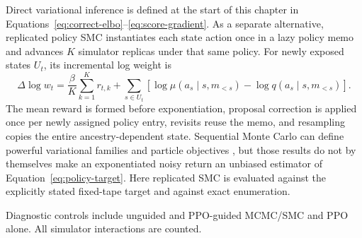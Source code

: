 Direct variational inference is defined at the start of this chapter in
Equations~\eqref{eq:correct-elbo}--\eqref{eq:score-gradient}. As a separate
alternative, replicated policy SMC instantiates each state action once in a lazy
policy memo and advances \(K\) simulator replicas under that same policy.
For newly exposed states \(U_t\), its incremental log weight is
\begin{equation}
  \Delta\log w_t
  = \frac{\beta}{K}\sum_{k=1}^{K}r_{t,k}
    +\sum_{s\in U_t}
      \left[\log\mu(a_s\mid s,m_{<s})
            -\log q(a_s\mid s,m_{<s})\right].
  \label{eq:guided-weight}
\end{equation}
The mean reward is formed before exponentiation, proposal correction is applied
once per newly assigned policy entry, revisits reuse the memo, and resampling
copies the entire ancestry-dependent state.  Sequential Monte Carlo can define
powerful variational families \citep{naessethEtAl2018} and particle objectives
\citep{maddisonEtAl2017}, but those results do not by themselves make an
exponentiated noisy return an unbiased estimator of
Equation~\eqref{eq:policy-target}.  Here replicated SMC is evaluated against
the explicitly stated fixed-tape target and against exact enumeration.

Diagnostic controls include unguided and PPO-guided MCMC/SMC and PPO alone.
All simulator interactions are counted.
